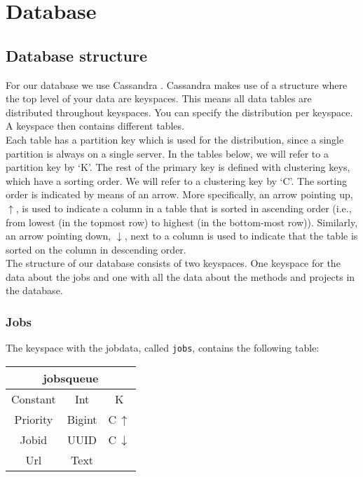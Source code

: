 \documentclass[../Main.tex]{subfiles}
\begin{document}
\newpage
\section{Database}
\subsection{Database structure}
For our database we use Cassandra \cite{cassandra}. Cassandra makes use of a structure where the top level of your data are keyspaces. This means all data tables are distributed throughout keyspaces. You can specify the distribution per keyspace. A keyspace then contains different tables. \\

Each table has a partition key which is used for the distribution, since a single partition is always on a single server. In the tables below, we will refer to a partition key by ‘K'. The rest of the primary key is defined with clustering keys, which have a sorting order. We will refer to a clustering key by ‘C'. The sorting order is indicated by means of an arrow. More specifically, an arrow pointing up, $\uparrow$, is used to indicate a column in a table that is sorted in ascending order (i.e., from lowest (in the topmost row) to highest (in the bottom-most row)). Similarly, an arrow pointing down, $\downarrow$, next to a column is used to indicate that the table is sorted on the column in descending order.\\

The structure of our database consists of two keyspaces. One keyspace for the data about the jobs and one with all the data about the methods and projects in the database. 

\subsubsection{Jobs}
The keyspace with the jobdata, called \texttt{jobs}, contains the following table:

\begin{table}[h]
    \centering
    \begin{tabular}{|ccc|}
\hline
    \multicolumn{3}{|c|}{\textbf{jobsqueue}}   \\
    \hline
    Constant & Int & K \\
    Priority & Bigint & C\,$\uparrow$ \\
    Jobid & UUID & C\,$\downarrow$ \\
    Url & Text & \\
    \hline
\end{tabular}
\end{table}
\end{document}

